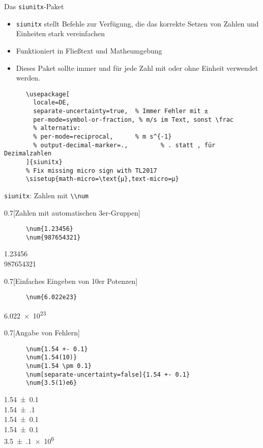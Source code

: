\begin{frame}[fragile]{
  Das \texttt{siunitx}-Paket
  \hfill
}
\begin{itemize}
    \item \texttt{siunitx} stellt Befehle zur Verfügung, die das korrekte Setzen von Zahlen und Einheiten stark vereinfachen
    \item Funktioniert in Fließtext und Matheumgebung
    \item[$\color{vertexDarkRed}\Rightarrow$] Dieses Paket sollte \alert{immer} und für \alert{jede} Zahl mit oder ohne Einheit verwendet werden.
\end{itemize}
  \begin{Packages}
    \begin{lstlisting}
      \usepackage[
        locale=DE,
        separate-uncertainty=true,  % Immer Fehler mit ±
        per-mode=symbol-or-fraction, % m/s im Text, sonst \frac
        % alternativ:
        % per-mode=reciprocal,      % m s^{-1}
        % output-decimal-marker=.,         % . statt , für Dezimalzahlen
      ]{siunitx}
      % Fix missing micro sign with TL2017
      \sisetup{math-micro=\text{µ},text-micro=µ}
    \end{lstlisting}
  \end{Packages}
\end{frame}

\begin{frame}[fragile]{\texttt{siunitx}: Zahlen mit \lstinline+\\num+}
  \begin{CodeExample}{0.7}[Zahlen mit automatischen 3er-Gruppen]
    \begin{lstlisting}
      \num{1.23456}
      \num{987654321}
    \end{lstlisting}
  \CodeResult
    \strut
    \num{1.23456} \\
    \num{987654321}
  \end{CodeExample}
  \begin{CodeExample}{0.7}[Einfaches Eingeben von 10er Potenzen]
    \begin{lstlisting}
      \num{6.022e23}
    \end{lstlisting}
  \CodeResult
    \strut
    \num{6.022e23}
  \end{CodeExample}
  \begin{CodeExample}{0.7}[Angabe von Fehlern]
    \begin{lstlisting}
      \num{1.54 +- 0.1}
      \num{1.54(10)}
      \num{1.54 \pm 0.1}
      \num[separate-uncertainty=false]{1.54 +- 0.1}
      \num{3.5(1)e6}
    \end{lstlisting}
  \CodeResult
    \strut
    \num{1.54 +- 0.1} \\
    \num{1.54(10)} \\
    \num{1.54 \pm 0.1} \\
    \num[separate-uncertainty=false]{1.54 +- 0.1} \\
    \num{3.5(1)e6}
  \end{CodeExample}
\end{frame}

